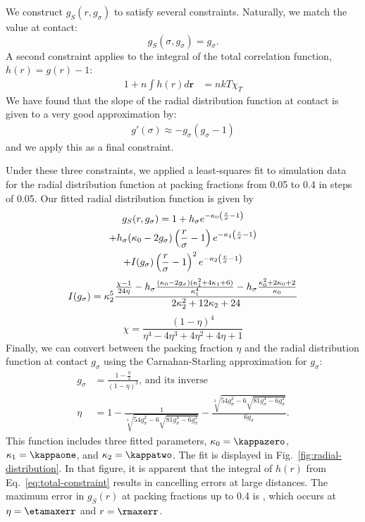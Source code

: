 \documentclass[letterpaper,twocolumn,amsmath,amssymb,pre,aps,10pt]{revtex4-1}
\newcommand{\rr}{\textbf{r}}
\begin{document}
We construct $g_S(r, g_\sigma)$ to satisfy several constraints.
Naturally, we match the value at contact:
\begin{equation}
  g_S(\sigma, g_\sigma) = g_\sigma.
\end{equation}
A second constraint applies to the integral of the total correlation
function, $h(r) = g(r) - 1$:
\begin{align}
  1 + n\int h(r)d\rr &= nkT\chi_T \label{eq:total-constraint}
\end{align}
We have found that the slope of the radial distribution function at
contact is given to a very good approximation by:
\begin{align}
  g'(\sigma) \approx - g_\sigma (g_\sigma - 1)
\end{align}
and we apply this as a final constraint.\par
Under these three constraints, we applied a least-squares fit to
simulation data for the radial distribution function at packing
fractions from 0.05 to 0.4 in steps of 0.05.  Our fitted radial
distribution function is given by
\begin{multline}
  g_S(r,g_\sigma) = 1 + h_\sigma e^{-\kappa_0 \left(\frac{r}{\sigma}-1\right)} \\
  + h_\sigma(\kappa_0 - 2g_\sigma)  \left(\frac{r}{\sigma}-1\right)e^{-\kappa_1  \left(\frac{r}{\sigma}-1\right)} \\
  + I(g_\sigma)  \left(\frac{r}{\sigma}-1\right)^2e^{-\kappa_2  \left(\frac{r}{\sigma}-1\right)}
\end{multline}
\begin{equation}
  I(g_\sigma) = \kappa_2^5 \frac{
    \frac{\chi-1}{24\eta} - h_\sigma \frac{(\kappa_0-2
      g_\sigma)(\kappa_1^2 + 4 \kappa_1 + 6)}{\kappa_1^4}
    - h_\sigma\frac{\kappa_0^2 + 2\kappa_0 + 2}{\kappa_0}
  }{2 \kappa_2^2 + 12 \kappa_2 + 24}
\end{equation}
\begin{equation}
  \chi = \frac{(1-\eta)^4}{\eta^4 - 4\eta^3 + 4\eta^2 + 4\eta + 1}
\end{equation}
Finally, we can convert between the packing fraction $\eta$ and the
radial distribution function at contact $g_\sigma$ using the
Carnahan-Starling approximation for $g_\sigma$:
\newcommand\nastyetacuberoot{\sqrt[3]{54 g_\sigma^2 -
    6\sqrt{81g_\sigma^4 - 6g_\sigma^3}}}
\begin{align}
  g_\sigma &= \frac{1-\tfrac{\eta}{2}}{(1-\eta)^3}\text{, and its inverse} \\
  \eta &= 1 - \frac{1}{\nastyetacuberoot} - \frac{\nastyetacuberoot}{6g_\sigma}.
\end{align}
This function includes three fitted parameters, $\kappaO =
\kappazero$, $\kappaI = \kappaone$,
and $\kappaZ = \kappatwo$.
The fit is displayed in Fig.~\ref{fig:radial-distribution}.  In that
figure, it is apparent that the integral of $h(r)$ from
Eq.~\ref{eq:total-constraint} results in cancelling errors at large
distances.  The maximum error in $g_S(r)$ at packing fractions up to
0.4 is \maxerr, which occurs at $\eta = \etamaxerr$ and $r =
\rmaxerr$.
\end{document}
